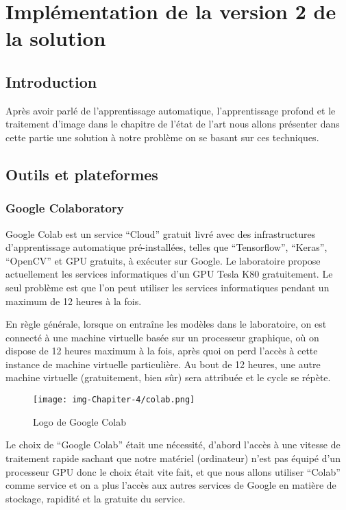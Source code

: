 \documentclass[12pt]{article}
\begin{document}
\newpage

\section{Implémentation de la version 2 de la solution}
\subsection{Introduction}
Après avoir parlé de l’apprentissage automatique, l’apprentissage profond et le traitement d’image dans le chapitre de l’état de l’art nous allons présenter dans cette partie une solution à notre problème on se basant sur ces techniques.

\subsection{Outils et plateformes}
\subsubsection*{Google Colaboratory}
Google Colab est un service “Cloud” gratuit livré avec des infrastructures d’apprentissage automatique pré-installées, telles que “Tensorflow”, “Keras”, “OpenCV” et GPU gratuits, à exécuter sur Google. Le laboratoire propose actuellement les services informatiques d’un GPU Tesla K80 gratuitement. Le seul problème est que l'on peut utiliser les services informatiques pendant un maximum de 12 heures à la fois. 

En règle générale, lorsque on entraîne les modèles dans le laboratoire, on est connecté à une machine virtuelle basée sur un processeur graphique, où on dispose de 12 heures maximum à la fois, après quoi on perd l'accès à cette instance de machine virtuelle particulière. Au bout de 12 heures, une autre machine virtuelle (gratuitement, bien sûr)  sera attribuée et le cycle se répète.

\begin{figure}[h]
	\centering
	\texttt{[image: img-Chapiter-4/colab.png]}
	\caption{Logo de Google Colab}
\end{figure}

Le choix de “Google Colab” était une nécessité, d’abord l’accès à une vitesse de traitement rapide sachant que notre matériel (ordinateur) n’est pas équipé d’un processeur GPU donc le choix était vite fait, et que nous allons utiliser “Colab” comme service et on a plus l’accès aux autres services de Google en matière de stockage, rapidité et la gratuite du service.
\end{document}
